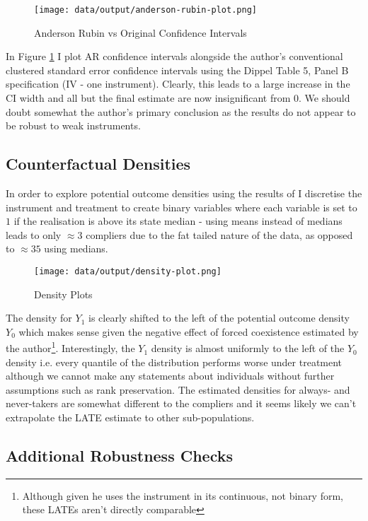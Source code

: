 \documentclass[12pt]{article}
\begin{document}
\begin{figure}[htbp]
    \centering
    \texttt{[image: data/output/anderson-rubin-plot.png]}
    \caption{Anderson Rubin vs Original Confidence Intervals}
    \label{AR}
\end{figure}
In Figure \ref{AR} I plot AR confidence intervals alongside the author's conventional clustered standard error confidence intervals using the Dippel Table 5, Panel B specification (IV - one instrument).
Clearly, this leads to a large increase in the CI width and all but the final estimate are now insignificant from 0. We should doubt somewhat the author's primary conclusion as the results
do not appear to be robust to weak instruments.
\subsection{Counterfactual Densities}
In order to explore potential outcome densities using the results of \cite{imbens-rubin}
I discretise the instrument and treatment to create binary variables where each variable is set to $1$ if the realisation is above its
state median - using means instead of medians leads to only $\approx 3$ compliers due to the fat tailed nature of the data, as opposed to $\approx 35$ using medians.


\begin{figure}[htbp]
    \centering
    \texttt{[image: data/output/density-plot.png]}
    \caption{Density Plots}
    \label{dens}
\end{figure}


The density for $Y_1$ is clearly shifted to the left of the potential outcome density $Y_0$ which makes sense given the negative effect 
of forced coexistence estimated by the author\footnote{Although given he uses the instrument in its continuous, not binary form, these LATEs aren't directly comparable}. Interestingly, the $Y_1$ density is almost uniformly to the left of the $Y_0$ density i.e. 
every quantile of the distribution performs worse under treatment although we cannot make any statements about individuals without 
further assumptions such as rank preservation. The estimated densities for always- and never-takers are somewhat different to the compliers 
and it seems likely we can't extrapolate the LATE estimate to other sub-populations.
\subsection{Additional Robustness Checks}
\end{document}
